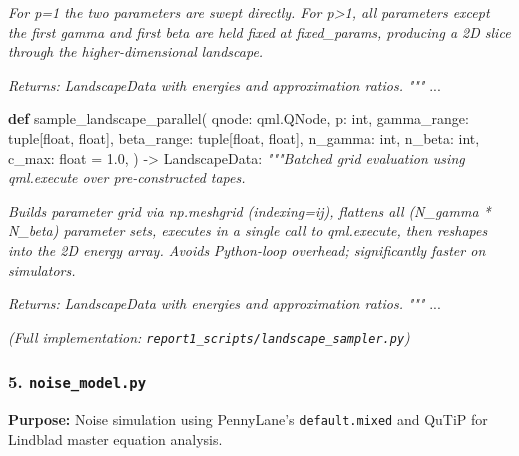 \documentclass[
  11pt,
]{report}
\newenvironment{Shaded}{}{}
\newcommand{\BuiltInTok}[1]{\textcolor[rgb]{0.00,0.50,0.00}{#1}}
\newcommand{\CommentTok}[1]{\textcolor[rgb]{0.38,0.63,0.69}{\textit{#1}}}
\newcommand{\FloatTok}[1]{\textcolor[rgb]{0.25,0.63,0.44}{#1}}
\newcommand{\KeywordTok}[1]{\textcolor[rgb]{0.00,0.44,0.13}{\textbf{#1}}}
\newcommand{\NormalTok}[1]{#1}
\newcommand{\OperatorTok}[1]{\textcolor[rgb]{0.40,0.40,0.40}{#1}}
\begin{document}
\begin{Shaded}
\begin{Highlighting}[]
\CommentTok{    For p=1 the two parameters are swept directly. For p\textgreater{}1, all}
\CommentTok{    parameters except the first gamma and first beta are held fixed}
\CommentTok{    at fixed\_params, producing a 2D slice through the higher{-}dimensional}
\CommentTok{    landscape.}

\CommentTok{    Returns:}
\CommentTok{        LandscapeData with energies and approximation ratios.}
\CommentTok{    """}
\NormalTok{    ...}


\KeywordTok{def}\NormalTok{ sample\_landscape\_parallel(}
\NormalTok{    qnode: qml.QNode,}
\NormalTok{    p: }\BuiltInTok{int}\NormalTok{,}
\NormalTok{    gamma\_range: }\BuiltInTok{tuple}\NormalTok{[}\BuiltInTok{float}\NormalTok{, }\BuiltInTok{float}\NormalTok{],}
\NormalTok{    beta\_range: }\BuiltInTok{tuple}\NormalTok{[}\BuiltInTok{float}\NormalTok{, }\BuiltInTok{float}\NormalTok{],}
\NormalTok{    n\_gamma: }\BuiltInTok{int}\NormalTok{,}
\NormalTok{    n\_beta: }\BuiltInTok{int}\NormalTok{,}
\NormalTok{    c\_max: }\BuiltInTok{float} \OperatorTok{=} \FloatTok{1.0}\NormalTok{,}
\NormalTok{) }\OperatorTok{{-}\textgreater{}}\NormalTok{ LandscapeData:}
    \CommentTok{"""Batched grid evaluation using qml.execute over pre{-}constructed tapes.}

\CommentTok{    Builds parameter grid via np.meshgrid (indexing=\textquotesingle{}ij\textquotesingle{}), flattens all}
\CommentTok{    (N\_gamma * N\_beta) parameter sets, executes in a single call to}
\CommentTok{    qml.execute, then reshapes into the 2D energy array. Avoids}
\CommentTok{    Python{-}loop overhead; significantly faster on simulators.}

\CommentTok{    Returns:}
\CommentTok{        LandscapeData with energies and approximation ratios.}
\CommentTok{    """}
\NormalTok{    ...}
\end{Highlighting}
\end{Shaded}

\emph{(Full implementation:
\texttt{report1\_scripts/landscape\_sampler.py})}

\subsubsection{\texorpdfstring{5.
\texttt{noise\_model.py}}{5. noise\_model.py}}\label{noise_model.py}

\textbf{Purpose:} Noise simulation using PennyLane's
\texttt{default.mixed} and QuTiP for Lindblad master equation analysis.
\end{document}
